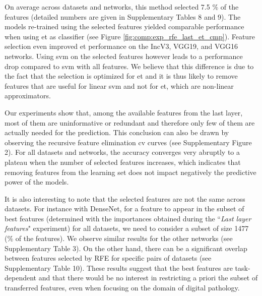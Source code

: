 

On average across datasets and networks, this method selected 7.5 \% of the features (detailed numbers are given in Supplementary Tables 8 and 9). The models re-trained using the selected features yielded comparable performance when using \acrshort{et} as classifier (see Figure \ref{fig:comp:exp_rfe_last_et_cmp}). Feature selection even improved \acrshort{et} performance on the IncV3, VGG19, and VGG16 networks. Using \acrshort{svm} on the selected features however leads to a performance drop compared to \acrshort{svm} with all features. We believe that this difference is due to the fact that the selection is optimized for \acrshort{et} and it is thus likely to remove features that are useful for linear \acrshort{svm} and not for \acrshort{et}, which are non-linear approximators.

Our experiments show that, among the available features from the last layer, most of them are uninformative or redundant and therefore only few of them are actually needed for the prediction. This conclusion can also be drawn by observing the recursive feature elimination \acrlong{cv} curves (see Supplementary Figure 2). For all datasets and networks, the accuracy converges very abruptly to a plateau when the number of selected features increases, which indicates that removing features from the learning set does not impact negatively the predictive power of the models.

It is also interesting to note that the selected features are not the same across datasets. For instance with DenseNet, for a feature to appear in the subset of best features (determined with the importances obtained during the ``\textit{Last layer features}" experiment) for all datasets, we need to consider a subset of size 1477 (\% of the features). We observe similar results for the other networks (see Supplementary Table 3). On the other hand, there can be a significant overlap between features selected by RFE for specific pairs of datasets (see Supplementary Table 10). These results suggest that the best features are task-dependent and that there would be no interest in restricting a priori the subset of transferred features, even when focusing on the domain of digital pathology.
 
